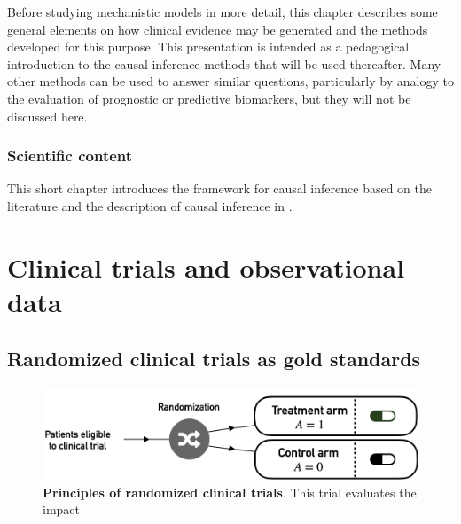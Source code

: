 \documentclass[a4paper,12pt,twoside,onecolumn,openright,final,oldfontcommands]{memoir}
\let\BeginKnitrBlock\begin \let\EndKnitrBlock\end
\begin{document}
Before studying mechanistic models in more detail, this chapter
describes some general elements on how clinical evidence may be
generated and the methods developed for this purpose. This presentation
is intended as a pedagogical introduction to the causal inference
methods that will be used thereafter. Many other methods can be used to
answer similar questions, particularly by analogy to the evaluation of
prognostic or predictive biomarkers, but they will not be discussed
here.

\BeginKnitrBlock{summarybox}
\subsubsection*{Scientific content}\label{scientific-content-5}

This short chapter introduces the framework for causal inference based
on the literature and the description of causal inference in
\citet{beal2020causal}.
\EndKnitrBlock{summarybox}

\newcommand{\indep}{\perp \!\!\! \perp}

\section{Clinical trials and observational
data}\label{clinical-trials-and-observational-data}

\subsection{Randomized clinical trials as gold
standards}\label{randomized-clinical-trials-as-gold-standards}

\begin{figure}

{\centering \includegraphics[width=0.9\linewidth]{fig/trials} 

}

\caption[Bimodality criteria and their combinations]{\textbf{Principles of randomized clinical trials}.
This trial evaluates the impact}\label{fig:trials}
\end{figure}
\end{document}
